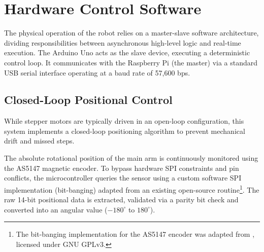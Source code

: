 \section{Hardware Control Software}
The physical operation of the robot relies on a master-slave software architecture, dividing responsibilities between asynchronous high-level logic and real-time execution. The Arduino Uno acts as the slave device, executing a deterministic control loop. It communicates with the Raspberry Pi (the master) via a standard USB serial interface operating at a baud rate of 57,600 bps.

\subsection{Closed-Loop Positional Control}
While stepper motors are typically driven in an open-loop configuration, this system implements a closed-loop positioning algorithm to prevent mechanical drift and missed steps. 

The absolute rotational position of the main arm is continuously monitored using the AS5147 magnetic encoder. To bypass hardware SPI constraints and pin conflicts, the microcontroller queries the sensor using a custom software SPI implementation (bit-banging) adapted from an existing open-source routine\footnote{The bit-banging implementation for the AS5147 encoder was adapted from \cite{mcr2019as51457}, licensed under GNU GPLv3.}. The raw 14-bit positional data is extracted, validated via a parity bit check and converted into an angular value ($-180^\circ$ to $180^\circ$).


